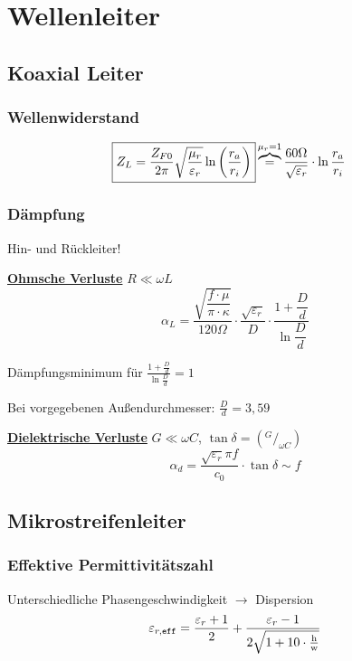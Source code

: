 \section{Wellenleiter}
\subsection{Koaxial Leiter}
\subsubsection{Wellenwiderstand}


\begin{align*}
	\Aboxed{Z_L & = \frac{Z_{F0}}{2\pi}\sqrt{\frac{\mu_r}{\varepsilon_r}}\ln\left( \frac{r_a}{r_i} \right)}  \overbrace{=}^{ \mu_r=1}\frac{60\Omega}{\sqrt{\varepsilon_r}}\cdot \ln{\frac{r_a}{r_i}}
\end{align*}

\subsubsection{Dämpfung}
Hin- und Rückleiter!

\underline{\textbf{Ohmsche Verluste}} $R\ll\omega L$
\[
	\alpha_L = \frac{\sqrt{\dfrac{f\cdot\mu}{\pi\cdot\kappa}}}{120\Omega}\cdot\frac{\sqrt{\varepsilon_r}}{D}\cdot\dfrac{1+\dfrac{D}{d}}{\ln \dfrac{D}{d}}
\]

Dämpfungsminimum für $ \frac{1+\tfrac{D}{d}}{\ln \tfrac{D}{d}} = 1 $

Bei vorgegebenen Außendurchmesser: $ \frac{D}{d} =3,59 $

\vspace{1em}
\underline{\textbf{Dielektrische Verluste}} $G\ll\omega C$, $\tan\delta=
(^G/_{\omega C})$
\[
	\alpha_d = \frac{\sqrt{\varepsilon_r}\pi f}{c_0}\cdot\tan\delta \sim f
\]

\subsection{Mikrostreifenleiter}


\subsubsection{Effektive Permittivitätszahl}
Unterschiedliche Phasengeschwindigkeit $\rightarrow$ Dispersion
\[
	\varepsilon_{r,\texttt{eff}}  = \frac{\varepsilon_r+1}{2}+\frac{\varepsilon_r-1}{2\sqrt{1+10\cdot\frac{\text{h}}{\text{w}}}} \\
\]

